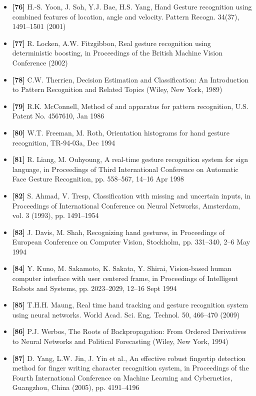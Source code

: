 \documentclass[12pt, a4paper]{article}
\begin{document}
\begin{itemize}[label=]
    \item \textbf{[76]} H.-S. Yoon, J. Soh, Y.J. Bae, H.S. Yang, Hand Gesture recognition using combined features of location, angle and velocity. Pattern Recogn. 34(37), 1491–1501 (2001)
    \item \textbf{[77]} R. Locken, A.W. Fitzgibbon, Real gesture recognition using deterministic boosting, in Proceedings of the British Machine Vision Conference (2002)
    \item \textbf{[78]} C.W. Therrien, Decision Estimation and Classification: An Introduction to Pattern Recognition and Related Topics (Wiley, New York, 1989)
    \item \textbf{[79]} R.K. McConnell, Method of and apparatus for pattern recognition, U.S. Patent No. 4567610, Jan 1986
    \item \textbf{[80]} W.T. Freeman, M. Roth, Orientation histograms for hand gesture recognition, TR-94-03a, Dec 1994
    \item \textbf{[81]} R. Liang, M. Ouhyoung, A real-time gesture recognition system for sign language, in Proceedings of Third International Conference on Automatic Face Gesture Recognition, pp. 558–567, 14–16 Apr 1998
    \item \textbf{[82]} S. Ahmad, V. Tresp, Classification with missing and uncertain inputs, in Proceedings of International Conference on Neural Networks, Amsterdam, vol. 3 (1993), pp. 1491–1954
    \item \textbf{[83]} J. Davis, M. Shah, Recognizing hand gestures, in Proceedings of European Conference on Computer Vision, Stockholm, pp. 331–340, 2–6 May 1994
    \item \textbf{[84]} Y. Kuno, M. Sakamoto, K. Sakata, Y. Shirai, Vision-based human computer interface with user centered frame, in Proceedings of Intelligent Robots and Systems, pp. 2023–2029, 12–16 Sept 1994
    \item \textbf{[85]} T.H.H. Maung, Real time hand tracking and gesture recognition system using neural networks. World Acad. Sci. Eng. Technol. 50, 466–470 (2009)
    \item \textbf{[86]} P.J. Werbos, The Roots of Backpropagation: From Ordered Derivatives to Neural Networks and Political Forecasting (Wiley, New York, 1994)
    \item \textbf{[87]} D. Yang, L.W. Jin, J. Yin et al., An effective robust fingertip detection method for finger writing character recognition system, in Proceedings of the Fourth International Conference on Machine Learning and Cybernetics, Guangzhou, China (2005), pp. 4191–4196

\end{itemize}
\end{document}
